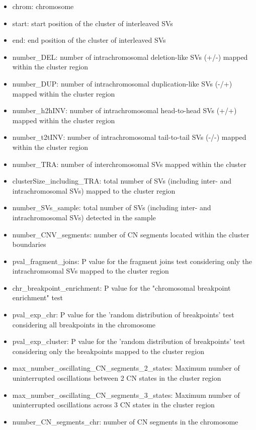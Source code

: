 \documentclass[twoside,a4wide,11pt]{article}\usepackage[]{graphicx}\usepackage[]{color}
\begin{document}
\begin{itemize}
\item chrom: chromosome
\item start: start position of the cluster of interleaved SVs
\item end: end position of the cluster of interleaved SVs
\item number\_DEL: number of intrachromosomal deletion-like SVs (+/-) mapped within the cluster region 
\item number\_DUP: number of intrachromosomal duplication-like SVs (-/+) mapped within the cluster region
\item number\_h2hINV: number of intrachromosomal head-to-head SVs (+/+) mapped within the cluster region
\item number\_t2tINV: number of intrachromosomal tail-to-tail SVs (-/-) mapped within the cluster region
\item number\_TRA: number of interchromosomal SVs mapped within the cluster
\item clusterSize\_including\_TRA: total number of SVs (including inter- and intrachromosomal SVs) mapped to the cluster region
\item number\_SVs\_sample: total number of SVs (including inter- and intrachromosomal SVs) detected in the sample
\item number\_CNV\_segments: number of CN segments located within the cluster boundaries
\item pval\_fragment\_joins: P value for the fragment joins test considering only the intrachromsomal SVs mapped to the cluster region
\item chr\_breakpoint\_enrichment: P value for the "chromosomal breakpoint enrichment" test
\item pval\_exp\_chr: P value for the 'random distribution of breakpoints' test considering all breakpoints in the  chromosome
\item pval\_exp\_cluster: P value for the 'random distribution of breakpoints' test considering only the breakpoints mapped to the cluster region
\item max\_number\_oscillating\_CN\_segments\_2\_states: Maximum number of uninterrupted oscillations between 2 CN states in the cluster region
\item max\_number\_oscillating\_CN\_segments\_3\_states: Maximum number of uninterrupted oscillations across 3 CN states in the cluster region
\item number\_CN\_segments\_chr: number of CN segments in the chromosome 

\end{itemize}
\end{document}
